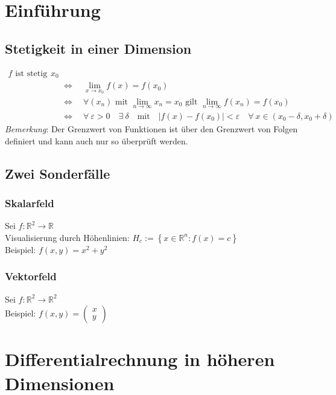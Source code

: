 \documentclass[11pt,a4paper]{book}
\newcommand {\R}	{\mathbb{R}}
\newcommand {\Rn}	{\mathbb{R}^n}
\newcommand {\Rzwei}	{\mathbb{R}^2}
\newcommand{\1}    	{\mathbbm{1}}
\begin{document}
\tableofcontents 

\chapter*{Einführung}
\section{Stetigkeit in einer Dimension}
\begin{align*}
	f \textrm{ ist stetig in } x_0 & \\
	&\quad \Leftrightarrow \quad
	\lim_{x \rightarrow x_0} f(x) = f(x_0) \\
	&\quad \Leftrightarrow \quad
	\forall \left(x_n\right) \textrm{ mit } \lim_{n \rightarrow \infty} x_n = x_0
	\textrm{ gilt }  \lim_{n \rightarrow \infty} f(x_n) = f(x_0) \\
	&\quad \Leftrightarrow \quad \forall~ \varepsilon > 0 \quad \exists~ \delta \quad \textrm{mit} \quad \vert f(x) - f(x_0) \vert < \varepsilon \quad \forall~ x \in \left( x_0 - \delta, x_0 + \delta \right)
\end{align*}
\textit{Bemerkung}: Der Grenzwert von Funktionen ist über den Grenzwert von Folgen definiert und kann auch nur so überprüft werden.

\section{Zwei Sonderfälle}
\subsection*{Skalarfeld}
Sei \( f : \Rzwei \rightarrow \R \) \\
Visualisierung durch Höhenlinien: \( H_c := \left\{ x \in \Rn : f(x) = c \right\} \) \\
Beispiel: \( f(x,y) = x^2 + y^2 \)

\subsection*{Vektorfeld}
Sei \( f : \Rzwei \rightarrow \Rzwei \) \\
Beispiel: \(f(x,y) = \left(\begin{array}{c} x \\ y \end{array} \right)\)

\chapter{Differentialrechnung in höheren Dimensionen}
\end{document}
